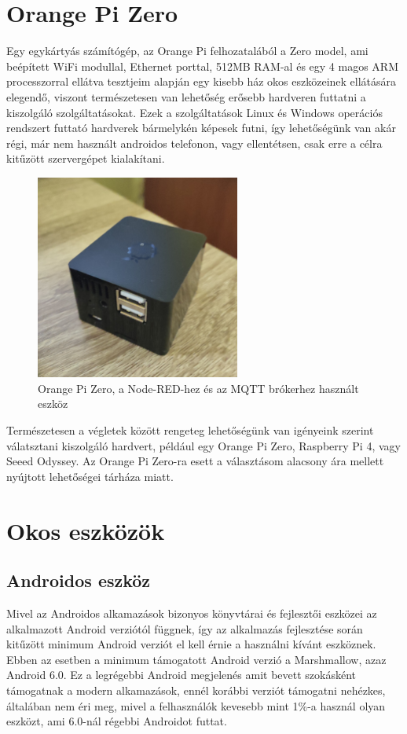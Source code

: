 \documentclass[
]{thesis-ekf}
\theoremstyle{definition}
\theoremstyle{remark}
\begin{document}
\section{Orange Pi Zero}
Egy egykártyás számítógép, az Orange Pi felhozatalából a Zero model, ami beépített WiFi modullal, Ethernet porttal, 
512MB RAM-al és egy 4 magos ARM processzorral ellátva tesztjeim alapján egy kisebb ház okos eszközeinek ellátására elegendő, 
viszont természetesen van lehetőség erősebb hardveren futtatni a kiszolgáló szolgáltatásokat. Ezek a szolgáltatások 
Linux és Windows operációs rendszert futtató hardverek bármelykén képesek futni, így lehetőségünk van akár 
régi, már nem használt androidos telefonon, vagy ellentétsen, csak erre a célra kitűzött szervergépet kialakítani. 
\begin{figure}[h]
	\centering
	\includegraphics[width=0.6\textwidth]{images/OPIZero.png}
	\caption{Orange Pi Zero\cite{orange}, a Node-RED-hez és az MQTT brókerhez használt eszköz}
\end{figure}
Természetesen a végletek között rengeteg lehetőségünk van igényeink szerint válatsztani kiszolgáló hardvert, például egy Orange Pi Zero, Raspberry Pi 4, vagy Seeed Odyssey.
Az Orange Pi Zero-ra esett a választásom alacsony ára mellett nyújtott lehetőségei tárháza miatt.

\section{Okos eszközök}

\subsection{Androidos eszköz}
Mivel az Androidos alkamazások bizonyos könyvtárai és fejlesztői eszközei az alkalmazott Android verziótól függnek, így az alkalmazás fejlesztése során
kitűzött minimum Android verziót el kell érnie a használni kívánt eszköznek. Ebben az esetben a minimum támogatott Android verzió a Marshmallow, azaz Android 6.0.
Ez a legrégebbi Android megjelenés amit bevett szokásként támogatnak a modern alkamazások, ennél korábbi verziót támogatni nehézkes, általában nem éri meg, mivel
a felhasználók kevesebb mint 1\%-a használ olyan eszközt, ami 6.0-nál régebbi Androidot futtat.
\end{document}
